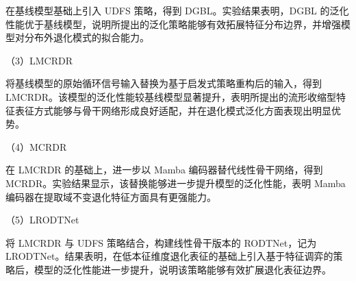 在基线模型基础上引入 UDFS 策略，得到 DGBL。实验结果表明，DGBL 的泛化性能优于基线模型，说明所提出的泛化策略能够有效拓展特征分布边界，并增强模型对分布外退化模式的拟合能力。

（3）LMCRDR

将基线模型的原始循环信号输入替换为基于启发式策略重构后的输入，得到 LMCRDR。该模型的泛化性能较基线模型显著提升，表明所提出的流形收缩型特征表征方式能够与骨干网络形成良好适配，并在退化模式泛化方面表现出明显优势。

（4）MCRDR

在 LMCRDR 的基础上，进一步以 Mamba 编码器替代线性骨干网络，得到 MCRDR。实验结果显示，该替换能够进一步提升模型的泛化性能，表明 Mamba 编码器在提取域不变退化特征方面具有更强能力。

（5）LRODTNet

将 LMCRDR 与 UDFS 策略结合，构建线性骨干版本的 RODTNet，记为 LRODTNet。结果表明，在低本征维度退化表征的基础上引入基于特征调弈的策略后，模型的泛化性能进一步提升，说明该策略能够有效扩展退化表征边界。

